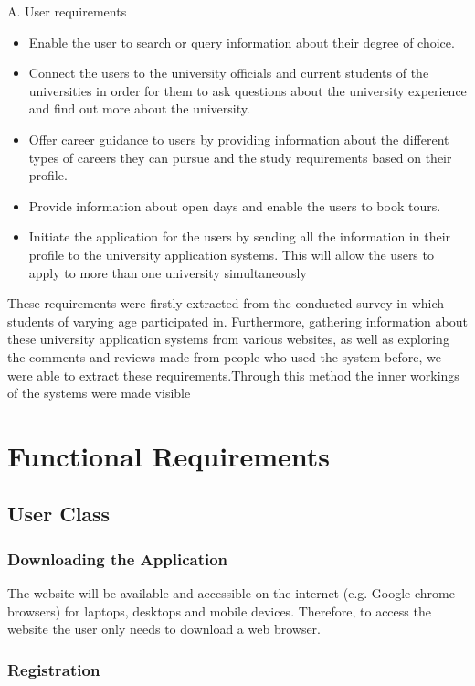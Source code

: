 \documentclass[a4paper, 12pt]{article}
\begin{document}
A.  User requirements 
\begin{itemize}
\item Enable the user to search or query information about their degree of choice.
\item Connect the users to the university officials and current students of the universities in order for them to ask questions about the university experience and find out more about the university.
\item Offer career guidance to users by providing information about the different types of careers they can pursue and the study requirements based on their profile.
\item Provide information about open days and enable the  users to book tours.
\item Initiate the application for the users by sending all the information in their profile to the university application systems. This will allow the users to apply to more than one university simultaneously 
\end{itemize}

These requirements were firstly extracted from the conducted survey in which students of varying age participated in. Furthermore, gathering information about these university application systems from various websites, as well as exploring the comments and reviews made from people who used the system before, we were able to extract these requirements.Through this method the inner workings of the systems were made visible

\newpage
\section{Functional Requirements}
\subsection{User Class}

\subsubsection{Downloading the Application}

The website will be available and accessible on the internet (e.g. Google chrome browsers) for laptops, desktops and mobile devices.
Therefore, to access the website the user only needs to download a web browser.

\subsubsection{Registration}
\end{document}
